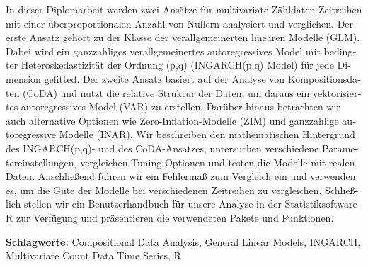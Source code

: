 \begin{otherlanguage}{german}

In dieser Diplomarbeit werden zwei Ansätze für multivariate Zähldaten-Zeitreihen mit einer überproportionalen Anzahl von Nullern analysiert und verglichen. Der erste Ansatz gehört zu der Klasse der verallgemeinerten linearen Modelle (GLM). Dabei wird ein ganzzahliges verallgemeinertes autoregressives Model mit bedingter Heteroskedastizität der Ordnung (p,q) (INGARCH(p,q) Model) für jede Dimension gefitted. Der zweite Ansatz basiert auf der Analyse von Kompositionsdaten (CoDA) und nutzt die relative Struktur der Daten, um daraus ein vektorisiertes autoregressives Model (VAR) zu erstellen. Darüber hinaus betrachten wir auch alternative Optionen wie Zero-Inflation-Modelle (ZIM) und ganzzahlige autoregressive Modelle (INAR). Wir beschreiben den mathematischen Hintergrund des INGARCH(p,q)- und des CoDA-Ansatzes, untersuchen verschiedene Parametereinstellungen, vergleichen Tuning-Optionen und testen die Modelle mit realen Daten. Anschließend führen wir ein Fehlermaß zum Vergleich ein und verwenden es, um die Güte der Modelle bei verschiedenen Zeitreihen zu vergleichen. Schließlich stellen wir ein Benutzerhandbuch für unsere Analyse in der Statistiksoftware R zur Verfügung und präsentieren die verwendeten Pakete und Funktionen. \newline

\textbf{Schlagworte:} Compositional Data Analysis, General Linear Models, INGARCH, Multivariate Count Data Time Series, R

\end{otherlanguage}